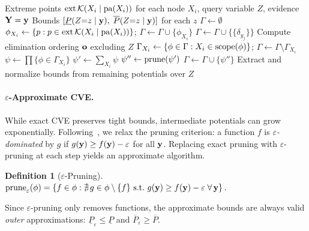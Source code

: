 \documentclass{article}
\newtheorem{definition}{Definition}
\begin{document}
\begin{algorithm}[t]
\caption{Credal Variable Elimination (CVE)}
\label{alg:cve}
\begin{algorithmic}[1]
\Require Extreme points $\mathrm{ext}\,\mathcal{K}(X_i \mid \mathrm{pa}(X_i))$ for each node $X_i$,
         query variable $Z$, evidence $\mathbf{Y} = \mathbf{y}$
\Ensure Bounds $[\underline{P}(Z{=}z \mid \mathbf{y}),\; \overline{P}(Z{=}z \mid \mathbf{y})]$ for each $z$
\Statex
\State $\Gamma \gets \emptyset$
  \State $\phi_{X_i} \gets \{p : p \in \mathrm{ext}\,\mathcal{K}(X_i \mid \mathrm{pa}(X_i))\}$;
  $\Gamma \gets \Gamma \cup \{\phi_{X_i}\}$
\EndFor
{}
  \State $\Gamma \gets \Gamma \cup \{\{\delta_{y_j}\}\}$
\EndFor
\State Compute elimination ordering $\mathbf{o}$ excluding $Z$
  \State $\Gamma_{X_i} \gets \{\phi \in \Gamma : X_i \in \mathrm{scope}(\phi)\}$;
  $\Gamma \gets \Gamma \setminus \Gamma_{X_i}$
  \State $\psi \gets \prod \{\phi \in \Gamma_{X_i}\}$
  \State $\psi' \gets \sum_{X_i} \psi$
  \State $\psi'' \gets \mathrm{prune}(\psi')$
  \State $\Gamma \gets \Gamma \cup \{\psi''\}$
\EndFor
\State Extract and normalize bounds from remaining potentials over $Z$
\end{algorithmic}
\end{algorithm}

\paragraph{$\varepsilon$-Approximate CVE.} While exact CVE preserves tight bounds, intermediate potentials can grow exponentially. Following~\cite{maua2012anytime}, we relax the pruning criterion: a function $f$ is \emph{$\varepsilon$-dominated} by $g$ if $g(\mathbf{y}) \geq f(\mathbf{y}) - \varepsilon$ for all $\mathbf{y}$. Replacing exact pruning with $\varepsilon$-pruning at each step yields an approximate algorithm.

\begin{definition}[$\varepsilon$-Pruning]
$\mathrm{prune}_\varepsilon(\phi) = \{f \in \phi : \nexists\, g \in \phi \setminus \{f\}
\text{ s.t.\ } g(\mathbf{y}) \geq f(\mathbf{y}) - \varepsilon\; \forall\, \mathbf{y}\}$.
\end{definition}

Since $\varepsilon$-pruning only removes functions, the approximate bounds are always valid \emph{outer} approximations: $\underline{P}_\varepsilon \leq \underline{P}$ and $\overline{P}_\varepsilon \geq \overline{P}$.
\end{document}
